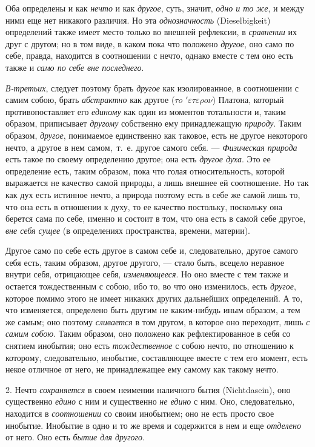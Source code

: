 Оба определены и как {\em нечто} и как
{\em другое}, суть, значит,
{\em одно и то же}, и между ними еще нет никакого
различия. Но эта {\em однозначность} (Dieselbigkeit)
определений также имеет место только во внешней рефлексии, в
{\em сравнении} их друг с другом; но в том виде, в
каком пока что положено {\em другое}, оно само по себе,
правда, находится в соотношении с нечто, однако вместе с тем оно есть также
и {\em само по себе вне последнего}.

{\em В-третьих}, следует поэтому брать
{\em другое} как изолированное, в соотношении с самим
собою, брать {\em абстрактно} как другое ($\tau o$
$'{\varepsilon} \tau \varepsilon \rho o\nu $) Платона, который
противопоставляет его {\em единому} как один из
моментов тотальности и, таким образом, приписывает
{\em другому} собственно ему принадлежащую
{\em природу}. Таким образом,
{\em другое}, понимаемое единственно как таковое, есть
не другое некоторого нечто, а другое в нем самом,~т.~е. другое самого себя.
— {\em Физическая природа} есть такое по своему
определению другое; она есть {\em другое духа}. Это ее
определение есть, таким образом, пока что голая относительность, которой
выражается не качество самой природы, а лишь внешнее ей соотношение. Но так
как дух есть истинное нечто, а природа поэтому есть в себе же самой лишь
то, что она есть в отношении к духу, то ее качество постольку, поскольку
она берется сама по себе, именно и состоит в том, что она есть в самой себе
другое, {\em вне себя сущее} (в определениях
пространства, времени, материи).

Другое само по себе есть другое в самом себе и, следовательно, другое самого
себя есть, таким образом, другое другого, — стало быть, всецело неравное
внутри себя, отрицающее себя, {\em изменяющееся}. Но
оно вместе с тем также и остается тождественным с собою, ибо то, во что оно
изменилось, есть {\em другое}, которое помимо этого не
имеет никаких других дальнейших определений. А то, что изменяется,
определено быть другим не каким-нибудь иным образом, а тем же самым; оно
поэтому {\em сливается} в том другом, в которое оно
переходит, лишь {\em с самим собою}. Таким образом, оно
положено как рефлектированное в себя со снятием инобытия; оно есть
{\em тождественное} с собою нечто, по отношению к
которому, следовательно, инобытие, составляющее вместе с тем его момент,
есть некое отличное от него, не принадлежащее ему самому как такому нечто.

2. Нечто {\em сохраняется} в своем неимении наличного
бытия (Nichtdasein), оно существенно {\em едино} с ним
и существенно {\em не едино} с ним. Оно, следовательно,
находится в {\em соотношении} со своим инобытием; оно
не есть просто свое инобытие. Инобытие в одно и то же время и содержится в
нем и еще {\em отделено} от него. Оно есть
{\em бытие для другого}.

